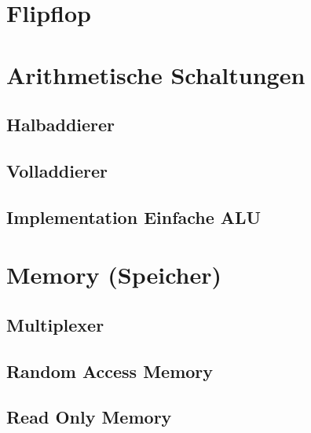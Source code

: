 \documentclass{report}
\begin{document}
\section{Flipflop}
\section{Arithmetische Schaltungen}
\subsection{Halbaddierer}
\subsection{Volladdierer}
\subsection{Implementation Einfache ALU}
\section{Memory (Speicher)}
\subsection{Multiplexer}

\subsection{Random Access Memory}

\subsection{Read Only Memory}
\end{document}
